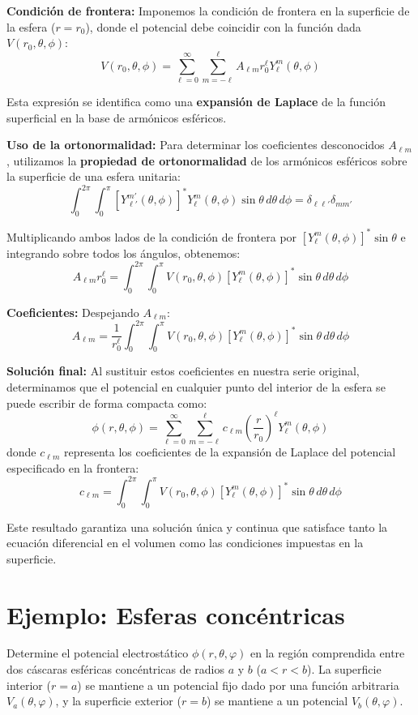 \documentclass[a4paper]{article}
\begin{document}
\textbf{Condición de frontera:}
Imponemos la condición de frontera en la superficie de la esfera ($r = r_0$), donde el potencial debe coincidir con la función dada $V(r_0, \theta, \phi)$:
$$
V(r_0, \theta, \phi) = \sum_{\ell=0}^\infty \sum_{m=-\ell}^\ell A_{\ell m} r_0^\ell Y_\ell^m(\theta, \phi)
$$

Esta expresión se identifica como una \textbf{expansión de Laplace} de la función superficial en la base de armónicos esféricos.

\textbf{Uso de la ortonormalidad:}
Para determinar los coeficientes desconocidos $A_{\ell m}$, utilizamos la \textbf{propiedad de ortonormalidad} de los armónicos esféricos sobre la superficie de una esfera unitaria:
$$
\int_0^{2\pi} \int_0^\pi [Y_{\ell'}^{m'}(\theta, \phi)]^* Y_\ell^m(\theta, \phi) \sin\theta \, d\theta \, d\phi = \delta_{\ell \ell'} \delta_{m m'}
$$

Multiplicando ambos lados de la condición de frontera por $[Y_\ell^m(\theta, \phi)]^* \sin\theta$ e integrando sobre todos los ángulos, obtenemos:
$$
A_{\ell m} r_0^\ell = \int_0^{2\pi} \int_0^\pi V(r_0, \theta, \phi) [Y_\ell^m(\theta, \phi)]^* \sin\theta \, d\theta \, d\phi
$$

\textbf{Coeficientes:}
Despejando $A_{\ell m}$:
$$
A_{\ell m} = \frac{1}{r_0^\ell} \int_0^{2\pi} \int_0^\pi V(r_0, \theta, \phi) [Y_\ell^m(\theta, \phi)]^* \sin\theta \, d\theta \, d\phi
$$

\textbf{Solución final:}
Al sustituir estos coeficientes en nuestra serie original, determinamos que el potencial en cualquier punto del interior de la esfera se puede escribir de forma compacta como:
$$
\phi(r, \theta, \phi) = \sum_{\ell=0}^\infty \sum_{m=-\ell}^\ell c_{\ell m} \left( \frac{r}{r_0} \right)^\ell Y_\ell^m(\theta, \phi)
$$
donde $c_{\ell m}$ representa los coeficientes de la expansión de Laplace del potencial especificado en la frontera:
$$
c_{\ell m} = \int_0^{2\pi} \int_0^\pi V(r_0, \theta, \phi) [Y_\ell^m(\theta, \phi)]^* \sin\theta \, d\theta \, d\phi
$$

Este resultado garantiza una solución única y continua que satisface tanto la ecuación diferencial en el volumen como las condiciones impuestas en la superficie.


\section{Ejemplo: Esferas concéntricas}

Determine el potencial electrostático $\phi(r, \theta, \varphi)$ en la región comprendida entre dos cáscaras esféricas concéntricas de radios $a$ y $b$ ($a < r < b$). La superficie interior ($r=a$) se mantiene a un potencial fijo dado por una función arbitraria $V_a(\theta, \varphi)$, y la superficie exterior ($r=b$) se mantiene a un potencial $V_b(\theta, \varphi)$.
\end{document}
